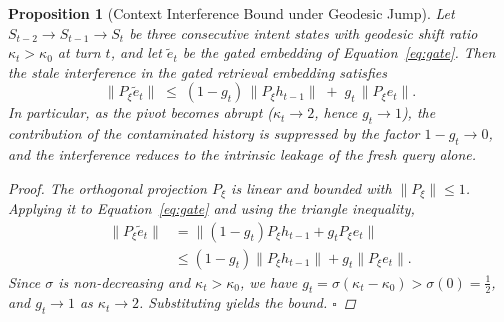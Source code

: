 \documentclass[11pt]{article}
\newtheorem{proposition}{Proposition}[section]
\begin{document}
\begin{proposition}[Context Interference Bound under Geodesic Jump]
\label{prop:interf}
Let $S_{t-2}\to S_{t-1}\to S_t$ be three consecutive intent states with geodesic shift ratio $\kappa_t>\kappa_0$ at turn $t$, and let $\tilde{e}_t$ be the gated embedding of Equation~\ref{eq:gate}. Then the stale interference in the gated retrieval embedding satisfies
\begin{equation}
\bigl\|P_\xi \tilde{e}_t\bigr\| \;\le\; (1-g_t)\,\bigl\|P_\xi h_{t-1}\bigr\| \;+\; g_t\,\bigl\|P_\xi e_t\bigr\|.
\label{eq:interfbound}
\end{equation}
In particular, as the pivot becomes abrupt ($\kappa_t\to 2$, hence $g_t\to 1$), the contribution of the contaminated history is suppressed by the factor $1-g_t\to 0$, and the interference reduces to the intrinsic leakage of the fresh query alone.

\begin{proof}
The orthogonal projection $P_\xi$ is linear and bounded with $\|P_\xi\|\le 1$. Applying it to Equation~\ref{eq:gate} and using the triangle inequality,
\begin{align*}
\bigl\|P_\xi \tilde{e}_t\bigr\|
&= \bigl\| (1-g_t)P_\xi h_{t-1} + g_t P_\xi e_t \bigr\| \\
&\le (1-g_t)\|P_\xi h_{t-1}\| + g_t\|P_\xi e_t\|.
\end{align*}
Since $\sigma$ is non-decreasing and $\kappa_t>\kappa_0$, we have $g_t = \sigma(\kappa_t-\kappa_0) > \sigma(0) = \tfrac{1}{2}$, and $g_t\to 1$ as $\kappa_t\to 2$. Substituting yields the bound. \hfill$\square$
\end{proof}
\end{proposition}
\end{document}
